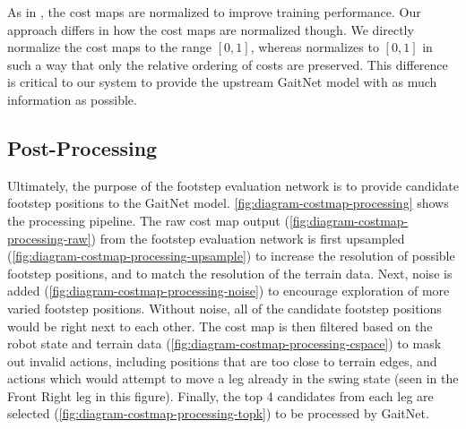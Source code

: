 As in \cite{bratta_contactnet_2024}, the cost maps are normalized to
improve training performance. Our approach differs in how the cost
maps are normalized though. We directly normalize the cost maps to
the range $[0, 1]$, whereas \cite{bratta_contactnet_2024} normalizes
to $[0,1]$ in such a way that only the relative ordering of costs are
preserved. This difference is critical to our system to provide the
upstream GaitNet model with as much information as possible.

\subsection{Post-Processing}

Ultimately, the purpose of the footstep evaluation network is to
provide candidate footstep positions to the GaitNet model.
\autoref{fig:diagram-costmap-processing} shows the processing pipeline.
The raw cost map output (\autoref{fig:diagram-costmap-processing-raw})
from the footstep evaluation network is first upsampled
(\autoref{fig:diagram-costmap-processing-upsample}) to increase the
resolution of possible footstep positions, and to match the resolution of
the terrain data. Next, noise is added
(\autoref{fig:diagram-costmap-processing-noise}) to
encourage exploration of more varied footstep positions. Without noise,
all of the candidate footstep positions would be right next to each other.
The cost map is then filtered based on the robot state and terrain data
(\autoref{fig:diagram-costmap-processing-cspace}) to mask out
invalid actions, including positions that are too close to terrain edges,
and actions which would attempt to move a leg already in the swing state
(seen in the Front Right leg in this figure). Finally, the top 4
candidates from each leg are selected
(\autoref{fig:diagram-costmap-processing-topk})
to be processed by GaitNet.

\def\imgwidth{0.16\textwidth}
\def\xgap{2em}          %
\def\arrowwidth{1.2em}  %
\def\arrowshift{0.5em} %

